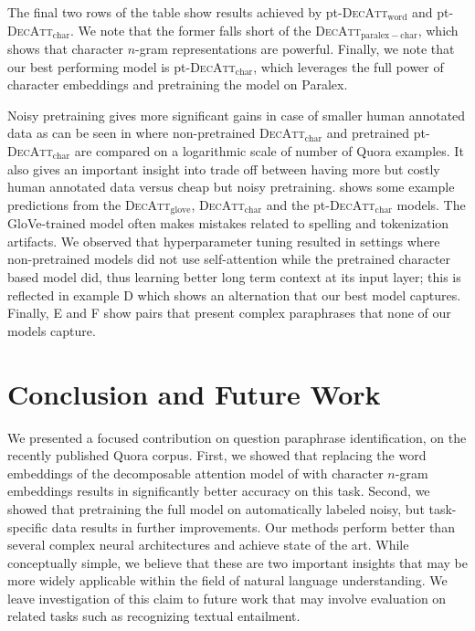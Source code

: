 \documentclass[11pt,letterpaper]{article}
\begin{document}
The final two rows of the table show results achieved by pt-\textsc{DecAtt}$_\mathrm{word}$ and pt-\textsc{DecAtt}$_\mathrm{char}$.  We note that the former falls short of the \textsc{DecAtt}$_\mathrm{paralex-char}$, which shows that character $n$-gram representations are powerful.  Finally, we note that our best performing model is pt-\textsc{DecAtt}$_\mathrm{char}$, which leverages the full power of character embeddings and pretraining the model on Paralex.

Noisy pretraining gives more significant gains in case of smaller human annotated data as can be seen in  where non-pretrained  \textsc{DecAtt}$_\mathrm{char}$ and pretrained pt-\textsc{DecAtt}$_\mathrm{char}$ are compared on a logarithmic scale of number of Quora examples. It also gives an important insight into trade off between having more but costly human annotated data versus cheap but noisy pretraining.   shows some example predictions from the  \textsc{DecAtt}$_\mathrm{glove}$, \textsc{DecAtt}$_\mathrm{char}$ and the pt-\textsc{DecAtt}$_\mathrm{char}$ models.  The GloVe-trained model often makes mistakes related to spelling and tokenization artifacts.  We observed that hyperparameter tuning resulted in settings where non-pretrained models did not use self-attention while the pretrained character based model did, thus learning better long term context at its input layer; this is reflected in example D which shows an alternation that our best model captures.  Finally, E and F show pairs that present complex paraphrases that none of our models capture.


\section{Conclusion and Future Work}
We presented a focused contribution on question paraphrase identification, on the recently published Quora corpus.
First, we showed that replacing the word embeddings of the decomposable attention model of  with character $n$-gram embeddings results in significantly better accuracy on this task. Second, we showed that pretraining the full model on automatically labeled noisy, but task-specific data results in further improvements.
Our methods perform better than several complex neural architectures and achieve state of the art. While conceptually simple, we believe that these are two important insights that may be more widely applicable within the field of natural language understanding. We leave investigation of this claim to future work that may involve evaluation on related tasks such as recognizing textual entailment.


\end{document}
